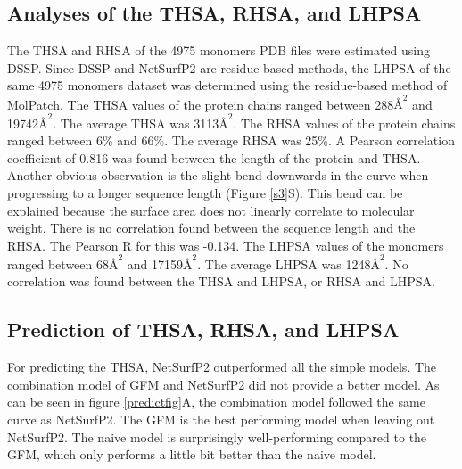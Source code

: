 \documentclass[11pt,a4paper]{article}
\begin{document}
\subsection{Analyses of the THSA, RHSA, and LHPSA}
The THSA and RHSA of the 4975 monomers PDB files were estimated using DSSP. Since DSSP and NetSurfP2 are residue-based methods, the LHPSA of the same 4975 monomers dataset was determined using the residue-based method of MolPatch. The THSA values of the protein chains ranged between 288$\si{\angstrom}^2$ and 19742$\si{\angstrom}^2$. The average THSA was 3113$\si{\angstrom}^2$. The RHSA values of the protein chains ranged between 6\% and 66\%. The average RHSA was 25\%. A Pearson correlation coefficient of 0.816 was found between the length of the protein and THSA. Another obvious observation is the slight bend downwards in the curve when progressing to a longer sequence length (Figure \ref{s3}S). This bend can be explained because the surface area does not linearly correlate to molecular weight. There is no correlation found between the sequence length and the RHSA. The Pearson R for this was -0.134. The LHPSA values of the monomers ranged between 68$\si{\angstrom}^2$ and 17159$\si{\angstrom}^2$. The average LHPSA was 1248$\si{\angstrom}^2$. No correlation was found between the THSA and LHPSA, or RHSA and LHPSA.


\subsection{Prediction of THSA, RHSA, and LHPSA}
For predicting the THSA, NetSurfP2 outperformed all the simple models. The combination model of GFM and NetSurfP2 did not provide a better model. As can be seen in figure \ref{predictfig}A, the combination model followed the same curve as NetSurfP2. The GFM is the best performing model when leaving out NetSurfP2. The naive model is surprisingly well-performing compared to the GFM, which only performs a little bit better than the naive model.
\end{document}
